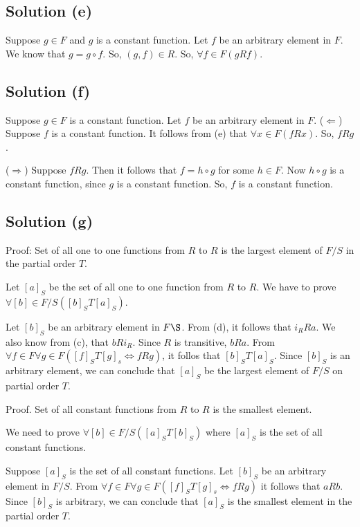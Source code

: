 \documentclass{article}
\begin{document}
\subsection{Solution (e)}
Suppose $g \in F$ and $g$ is a constant function. Let $f$ be an
arbitrary element in $F$. We know that $g = g \circ f$. So, $(g,f) \in
R$. So, $\forall f \in F(gRf)$.

\subsection{Solution (f)}
Suppose $g \in F$ is a constant function. Let $f$ be an arbitrary
element in $F$.
($\Leftarrow$) Suppose $f$ is a constant function. It follows from (e)
that $\forall x \in F(fRx)$. So, $fRg$.

($\Rightarrow$) Suppose $fRg$. Then it follows that $f = h \circ g$
for some $h \in F$. Now $h \circ g$ is a constant function, since $g$
is a constant function. So, $f$ is a constant function.

\subsection{Solution (g)}
Proof: Set of all one to one functions from $R$ to $R$ is the largest
element of $F/S$ in the partial order $T$.

Let $[a]_S$ be the set of all one to one function from $R$ to $R$. We
have to prove $\forall [b] \in F/S ([b]_S T [a]_S)$.

Let $[b]_S$ be an arbitrary element in $F\S$. From (d), it follows
that $i_RRa$. We also know from (c), that $bRi_R$. Since $R$ is
transitive, $bRa$. From $\forall f \in F \forall g \in F([f]_S T [g]_s
\iff fRg)$, it follos that $[b]_S T [a]_S$. Since $[b]_S$ is an
arbitrary element, we can conclude that $[a]_S$ be the largest element
of $F/S$ on partial order $T$.

Proof. Set of all constant functions from $R$ to $R$ is the smallest
element.

We need to prove $\forall [b] \in F/S([a]_S T [b]_S)$ where $[a]_S$ is
the set of all constant functions.

Suppose $[a]_S$ is the set of all constant functions. Let $[b]_S$ be
an arbitrary element in $F/S$. From
$\forall f \in F \forall g \in F([f]_S T [g]_s \iff fRg)$ it follows
that $aRb$. Since $[b]_S$ is arbitrary, we can conclude that $[a]_S$
is the smallest element in the partial order $T$.
\end{document}
